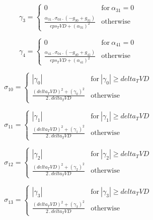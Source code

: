 \documentclass{article}
\begin{document}
\begin{dmath}\gamma_{3} = \begin{cases} 0 & \text{for}\: \alpha_{31} = 0 \\\frac{\alpha_{31} \,.\, \sigma_{0 3} \,.\, \left(- g_{30} + g_{31}\right)}{eps_TVD + \left(\alpha_{31} \right)^{2}} & \text{otherwise} \end{cases}\end{dmath}

\begin{dmath}\gamma_{4} = \begin{cases} 0 & \text{for}\: \alpha_{41} = 0 \\\frac{\alpha_{41} \,.\, \sigma_{0 4} \,.\, \left(- g_{40} + g_{41}\right)}{eps_TVD + \left(\alpha_{41} \right)^{2}} & \text{otherwise} \end{cases}\end{dmath}

\begin{dmath}\sigma_{1 0} = \begin{cases} \left|{\gamma_{0}}\right| & \text{for}\: \left|{\gamma_{0}}\right| \geq delta_TVD \\\frac{\left(delta_TVD \right)^{2} + \left(\gamma_{0} \right)^{2}}{2 \,.\, delta_TVD} & \text{otherwise} 
\end{cases}\end{dmath}

\begin{dmath}\sigma_{1 1} = \begin{cases} \left|{\gamma_{1}}\right| & \text{for}\: \left|{\gamma_{1}}\right| \geq delta_TVD \\\frac{\left(delta_TVD \right)^{2} + \left(\gamma_{1} \right)^{2}}{2 \,.\, delta_TVD} & \text{otherwise} 
\end{cases}\end{dmath}

\begin{dmath}\sigma_{1 2} = \begin{cases} \left|{\gamma_{2}}\right| & \text{for}\: \left|{\gamma_{2}}\right| \geq delta_TVD \\\frac{\left(delta_TVD \right)^{2} + \left(\gamma_{2} \right)^{2}}{2 \,.\, delta_TVD} & \text{otherwise} 
\end{cases}\end{dmath}

\begin{dmath}\sigma_{1 3} = \begin{cases} \left|{\gamma_{3}}\right| & \text{for}\: \left|{\gamma_{3}}\right| \geq delta_TVD \\\frac{\left(delta_TVD \right)^{2} + \left(\gamma_{3} \right)^{2}}{2 \,.\, delta_TVD} & \text{otherwise} 
\end{cases}\end{dmath}
\end{document}
